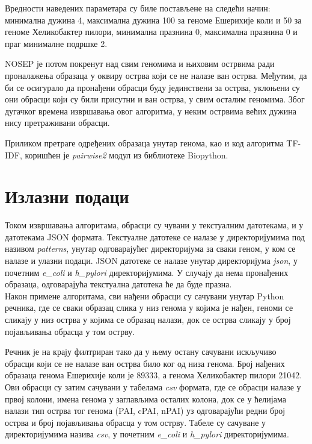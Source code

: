 \documentclass[12pt]{article}
\begin{document}
Вредности наведених параметара су биле постављене на следећи начин: минимална дужина 4, максимална дужина 100 за геноме Ешерихије коли и 50 за геноме Хеликобактер пилори, минимална празнина 0, максимална празнина 0 и праг минималне подршке 2.

NOSEP је потом покренут над свим геномима и њиховим острвима ради проналажења образаца у оквиру острва који се не налазе ван острва. Међутим, да би се осигурало да пронађени обрасци буду јединствени за острва, уклоњени су они обрасци који су били присутни и ван острва, у свим осталим геномима. Због дугачког времена извршавања овог алгоритма, у неким острвима већих дужина нису претраживани обрасци.

Приликом претраге одређених образаца унутар генома, као и код алгоритма TF-IDF, коришћен је \textit{pairwise2} модул из библиотеке Biopython.


\section{Излазни подаци}

Током извршавања алгоритама, обрасци су чувани у текстуалним датотекама, и у датотекама JSON формата. Текстуалне датотеке се налазе у директоријумима под називом \textit{patterns}, унутар одговарајућег директоријума за сваки геном, у ком се налазе и улазни подаци. JSON датотеке се налазе унутар директоријума \textit{json}, у почетним \textit{e\_coli} и \textit{h\_pylori} директоријумима. У случају да нема пронађених образаца, одговарајућа текстуална датотека ће да буде празна. \\

Након примене алгоритама, сви нађени обрасци су сачувани унутар Python речника, где се сваки образац слика у низ генома у којима је нађен, геноми се сликају у низ острва у којима се образац налази, док се острва сликају у број појављивања обрасца у том острву.

Речник је на крају филтриран тако да у њему остану сачувани искључиво обрасци који се не налазе ван острва било ког од низа генома. Број нађених образаца генома Ешерихије коли је 89333, а генома Хеликобактер пилори 21042. Ови обрасци су затим сачувани у табелама \textit{csv} формата, где се обрасци налазе у првој колони, имена генома у заглављима осталих колона, док се у ћелијама налази тип острва тог генома (PAI, cPAI, nPAI) уз одговарајући редни број острва и број појављивања обрасца у том острву. Табеле су сачуване у директоријумима назива \textit{csv}, у почетним \textit{e\_coli} и \textit{h\_pylori} директоријумима.
\end{document}

